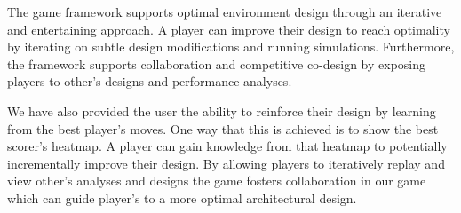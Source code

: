 The game framework supports optimal environment design through an iterative and entertaining approach. A player can improve their design to reach optimality by iterating on subtle design modifications and running simulations.  Furthermore, the framework supports collaboration and competitive co-design by exposing players to other's designs and performance analyses.

We have also provided the user the ability to reinforce their design by learning from the best player's moves. One way that this is achieved is to show the best scorer's heatmap. A player can gain knowledge from that heatmap to potentially incrementally improve their design. By allowing players to iteratively replay and view other's analyses and designs the game fosters collaboration in our game which can guide player's to a more optimal architectural design.